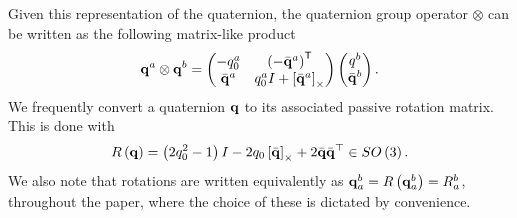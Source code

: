 Given this representation of the quaternion, the quaternion group operator
$\otimes$ can be written as the following matrix-like product
\begin{equation}
	\boldsymbol{\mathrm{q}}^a \otimes \boldsymbol{\mathrm{q}}^b = \begin{pmatrix} -q_0^a & \left(-\bar{\boldsymbol{\mathrm{q}}}^{a}\right)^{\mathsf{T}} \\ \bar{\boldsymbol{\mathrm{q}}}^a & q^a_0 I + \left[ \bar{\boldsymbol{\mathrm{q}}}^a \right]_{\times} \end{pmatrix}
	\begin{pmatrix} q^b \\ \bar{\boldsymbol{\mathrm{q}}}^b\end{pmatrix}.
\end{equation}
We frequently convert a quaternion $\boldsymbol{\mathrm{q}}$ to its associated passive rotation
matrix. This is done with
\begin{equation}
\label{eq:R_from_q}
R\left(\boldsymbol{\mathrm{q}}\right)=\left(2q_{0}^{2}-1\right)I-2q_{0}\left[ \bar{\boldsymbol{\mathrm{q}}} \right]_{\times}+2\bar{\boldsymbol{\mathrm{q}}}\bar{\boldsymbol{\mathrm{q}}}^{\top}\in SO\left(3\right).
\end{equation}
We also note that rotations are written equivalently as
$\boldsymbol{\mathrm{q}}_a^b=R\left(\boldsymbol{\mathrm{q}}_a^b\right)=R_a^b$, throughout the paper, where the choice of these is dictated by convenience.

